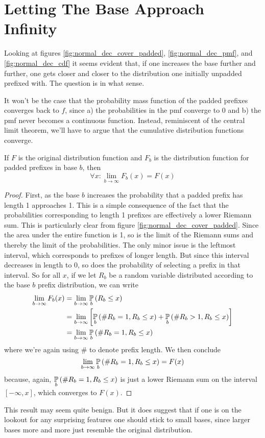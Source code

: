 \section{Letting The Base Approach Infinity}

Looking at figures \ref{fig:normal_dec_cover_padded}, \ref{fig:normal_dec_pmf}, and \ref{fig:normal_dec_cdf} it seems evident that, if one increases the base further and further, one gets closer and closer to the distribution one initially unpadded prefixed with. The question is in what sense.

It won't be the case that the probability mass function of the padded prefixes converges back to $f$, since a) the probabilities in the pmf converge to 0 and b) the pmf never becomes a continuous function. Instead, reminiscent of the central limit theorem, we'll have to argue that the cumulative distribution functions converge. 
\begin{proposition}
If $F$ is the original distribution function and $F_b$ is the distribution function for padded prefixes in base $b$, then
\[
\forall x: \lim_{b\rightarrow\infty} F_b(x) = F(x)
\]
\end{proposition}
\begin{proof}
First, as the base $b$ increases the probability that a padded prefix has length 1 approaches 1. This is a simple consequence of the fact that the probabilities corresponding to length 1 prefixes are effectively a lower Riemann sum. This is particularly clear from figure \ref{fig:normal_dec_cover_padded}. Since the area under the entire function is 1, so is the limit of the Riemann sums and thereby the limit of the probabilities. The only minor issue is the leftmost interval, which corresponds to prefixes of longer length. But since this interval decreases in length to 0, so does the probability of selecting a prefix in that interval. So for all $x$, if we let $R_b$ be a random variable distributed according to the base $b$ prefix distribution, we can write
\[
\begin{split}
\lim_{b\rightarrow\infty} F_b(x) 
& = \lim_{b\rightarrow\infty} \underset{b}{\mathbb{P}}\left(R_b \leq x\right)\\
& = \lim_{b\rightarrow\infty} \left[\underset{b}{\mathbb{P}}\left(\#R_b = 1, R_b \leq x\right)+ \underset{b}{\mathbb{P}}\left(\#R_b > 1, R_b \leq x\right)\right]\\
& = \lim_{b\rightarrow\infty} \underset{b}{\mathbb{P}}\left(\#R_b = 1, R_b \leq x\right)
\end{split}
\]
where we're again using $\#$ to denote prefix length. We then conclude
\[
\lim_{b\rightarrow\infty} \underset{b}{\mathbb{P}}\left(\#R_b = 1, R_b \leq x\right) = F(x)
\]
because, again, $\underset{b}{\mathbb{P}}\left(\#R_b = 1, R_b \leq x\right)$ is just a lower Riemann sum on the interval $[-\infty, x]$, which converges to $F(x)$.
\end{proof}

This result may seem quite benign. But it does suggest that if one is on the lookout for any surprising features one should stick to small bases, since larger bases more and more just resemble the original distribution.